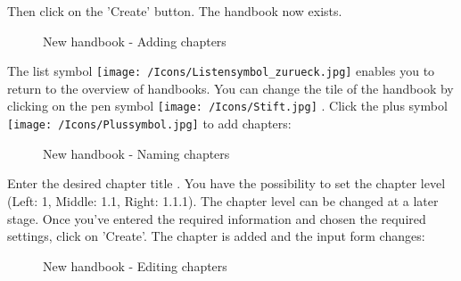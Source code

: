 Then click on the 'Create' button. The handbook now exists.

\begin{figure}[H]
\caption{New handbook - Adding chapters}
\end{figure}

The list symbol \texttt{[image: /Icons/Listensymbol\_zurueck.jpg]}  enables you to return to the overview of handbooks. You can change the tile of the handbook by clicking on the pen symbol \texttt{[image: /Icons/Stift.jpg]} . Click the plus symbol \texttt{[image: /Icons/Plussymbol.jpg]}  to add chapters:

\begin{figure}[H]
\caption{New handbook - Naming chapters}
\end{figure}

Enter the desired chapter title . You have the possibility to set the chapter level (Left: 1, Middle: 1.1, Right: 1.1.1). The chapter level can be changed at a later stage. Once you've entered the required information and chosen the required settings, click on 'Create'. The chapter is added and the input form changes:

\begin{figure}[H]
\caption{New handbook - Editing chapters}
\end{figure}

